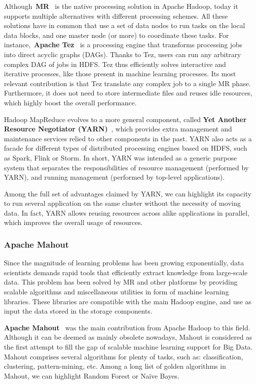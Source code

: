\documentclass[3p,review]{elsarticle}
\begin{document}
Although~\textbf{MR}~\cite{dean04} is the native processing solution in Apache Hadoop, today it supports multiple alternatives with different processing schemes. All these solutions have in common that use a set of data nodes to run tasks on the local data blocks, and one master node (or more) to coordinate these tasks. For instance,~\textbf{Apache Tez}~\cite{tez} is a processing engine that transforms processing jobs into direct acyclic graphs (DAGs). Thanks to Tez, users can run any arbitrary complex DAG of jobs in HDFS. Tez thus efficiently solves interactive and iterative processes, like those present in machine learning processes. Its most relevant contribution is that Tez translate any complex job to a single MR phase. Furthermore, it does not need to store intermediate files and reuses idle resources, which highly boost the overall performance.

Hadoop MapReduce evolves to a more general component, called \textbf{Yet Another Resource Negotiator (YARN)}~\cite{yarn}, which provides extra management and maintenance services relied to other components in the past. YARN also acts as a facade for different types of distributed processing engines based on HDFS, such as Spark, Flink or Storm. In short, YARN was intended as a generic purpose system that separates the responsibilities of resource management (performed by YARN), and running management (performed by top-level applications).

Among the full set of advantages claimed by YARN, we can highlight its capacity to run several application on the same cluster without the necessity of moving data. In fact, YARN allows reusing resources across alike applications in parallel, which improves the overall usage of resources.

\subsubsection{Apache Mahout}

Since the magnitude of learning problems has been growing exponentially, data scientists demands rapid tools that efficiently extract knowledge from large-scale data. This problem has been solved by MR and other platforms by providing scalable algorithms and miscellaneous utilities in form of machine learning libraries. These libraries are compatible with the main Hadoop engine, and use as input the data stored in the storage components. 

\textbf{Apache Mahout}~\cite{mahout} was the main contribution from Apache Hadoop to this field. Although it can be deemed as mainly obsolete nowadays, Mahout is considered as the first attempt to fill the gap of scalable machine learning support for Big Data. Mahout comprises several algorithms for plenty of tasks, such as: classification, clustering, pattern-mining, etc. Among a long list of golden algorithms in Mahout, we can highlight Random Forest or Na\"ive Bayes. 
\end{document}
